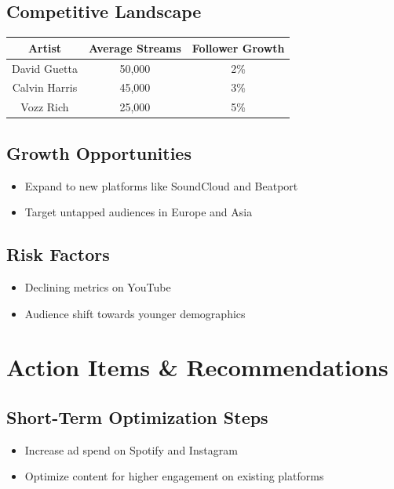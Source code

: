 \documentclass{report}
\begin{document}
\subsection{Competitive Landscape}

\begin{tabular}{|c|c|c|}
    \hline
    \textbf{Artist} & \textbf{Average Streams} & \textbf{Follower Growth} \\
    \hline
    David Guetta & 50,000 & 2\% \\
    Calvin Harris & 45,000 & 3\% \\
    Vozz Rich & 25,000 & 5\% \\
    \hline
\end{tabular}

\subsection{Growth Opportunities}

\begin{itemize}
    \item Expand to new platforms like SoundCloud and Beatport
    \item Target untapped audiences in Europe and Asia
\end{itemize}

\subsection{Risk Factors}

\begin{itemize}
    \item Declining metrics on YouTube
    \item Audience shift towards younger demographics
\end{itemize}

\newpage

\section{Action Items \& Recommendations}

\subsection{Short-Term Optimization Steps}

\begin{itemize}
    \item Increase ad spend on Spotify and Instagram
    \item Optimize content for higher engagement on existing platforms
\end{itemize}
\end{document}
